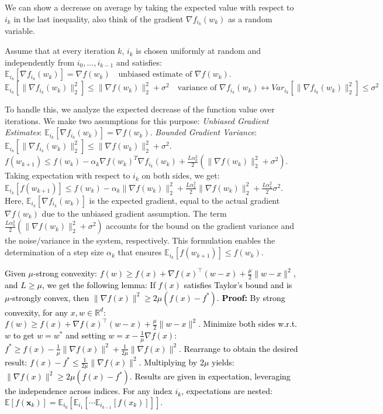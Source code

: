 \documentclass[a4paper,6pt]{extarticle}
\newcommand{\mybox}[2]{
    \begin{tcolorbox}[colback=color!5!white, colframe=color!75!black, boxsep=2pt, top=1pt, bottom=1pt, left=2pt, right=2pt, arc=3pt, outer arc=3pt, title={\textbf{#1}}]
    {\fontsize{5pt}{5pt}\selectfont \textcolor{black}{#2}}
    \end{tcolorbox}
}
\begin{document}
\begin{multicols}{2}
{We can show a decrease on average by taking the expected value with respect to $i_k$ in the last inequality, also think of the gradient $\nabla f_{i_k}(w_k)$ as a random variable.

Assume that at every iteration $k$, $i_k$ is chosen uniformly at random and independently from $i_0, \dots, i_{k-1}$ and satisfies: $\mathbb{E}_{i_k} \left[ \nabla f_{i_k}(w_k) \right] = \nabla f(w_k) \quad \text{unbiased estimate of } \nabla f(w_k)$. $\mathbb{E}_{i_k} \left[ \| \nabla f_{i_k}(w_k) \|_2^2 \right] \leq \| \nabla f(w_k) \|_2^2 + \sigma^2 \quad \text{variance of } \nabla f_{i_k}(w_k) \leftrightarrow Var_{i_k} \left[ \| \nabla f_{i_k}(w_k) \|_2^2 \right] \leq \sigma^2$

To handle this, we analyze the expected decrease of the function value over iterations. We make two assumptions for this purpose:
\textit{Unbiased Gradient Estimates}: $\mathbb{E}_{i_k}[\nabla f_{i_k}(w_k)] = \nabla f(w_k)$.
\textit{Bounded Gradient Variance}: $\mathbb{E}_{i_k}[\| \nabla f_{i_k}(w_k) \|_2^2] \leq \| \nabla f(w_k) \|_2^2 + \sigma^2$.
$f(w_{k+1}) \leq f(w_k) - \alpha_k \nabla f(w_k)^T \nabla f_{i_k}(w_k) + \frac{L \alpha_k^2}{2} \left( \| \nabla f(w_k) \|_2^2 + \sigma^2 \right)$.
Taking expectation with respect to $i_k$ on both sides, we get:
$\mathbb{E}_{i_k} \left[ f(w_{k+1}) \right] \leq f(w_k) - \alpha_k \| \nabla f(w_k) \|_2^2 + \frac{L \alpha_k^2}{2} \| \nabla f(w_k) \|_2^2 + \frac{L \alpha_k^2}{2} \sigma^2$. Here, $\mathbb{E}_{i_k} \left[ \nabla f_{i_k}(w_k) \right]$ is the expected gradient, equal to the actual gradient $\nabla f(w_k)$ due to the unbiased gradient assumption. The term $\frac{L \alpha_k^2}{2} \left( \| \nabla f(w_k) \|_2^2 + \sigma^2 \right)$ accounts for the bound on the gradient variance and the noise/variance in the system, respectively. This formulation enables the determination of a step size $\alpha_k$ that ensures $\mathbb{E}_{i_k} \left[ f(w_{k+1}) \right] \leq f(w_k)$.
}

\mybox{SGD: Strongly Convex Setting Analysis}{
Given \(\mu\)-strong convexity: \(f(w) \geq f(x) + \nabla f(x)^\top(w-x) + \frac{\mu}{2}\|w-x\|^2\), and \(L \geq \mu\), we get the following lemma: If \(f(x)\) satisfies Taylor's bound and is \(\mu\)-strongly convex, then \(\|\nabla f(x)\|^2 \geq 2\mu (f(x) - f^*)\). \textbf{Proof:}
By strong convexity, for any \(x, w \in \mathbb{R}^d\): \(f(w) \geq f(x) + \nabla f(x)^\top(w-x) + \frac{\mu}{2}\|w-x\|^2.\)
Minimize both sides w.r.t. \(w\) to get \(w = w^*\) and setting \(w = x - \frac{1}{\mu}\nabla f(x)\): \(f^* \geq f(x) - \frac{1}{\mu}\|\nabla f(x)\|^2 + \frac{1}{2\mu}\|\nabla f(x)\|^2.\)
Rearrange to obtain the desired result:
\(f(x) - f^* \leq \frac{1}{2\mu}\|\nabla f(x)\|^2.\) Multiplying by \(2\mu\) yields: \(\|\nabla f(x)\|^2 \geq 2\mu(f(x) - f^*)\). Results are given in expectation, leveraging the independence across indices. For any index \(i_k\), expectations are nested:
$\mathbb{E}[f(\mathbf{x}_k)] = \mathbb{E}_{i_0}[\mathbb{E}_{i_1}[\cdots \mathbb{E}_{i_{k-1}}[f(x_k)]]].$

}
\end{multicols}
\end{document}
